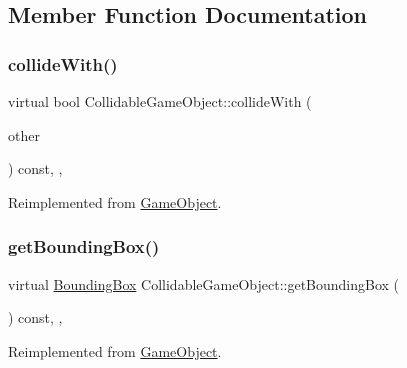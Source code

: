 \subsection{Member Function Documentation}
\mbox{\label{class_collidable_game_object_aabc837db5ee83847ad55a5f95cb106a6}} 
\subsubsection{\texorpdfstring{collide\+With()}{collideWith()}}
{\footnotesize\ttfamily virtual bool Collidable\+Game\+Object\+::collide\+With (\begin{DoxyParamCaption}\item[{const \hyperlink{class_game_object}{Game\+Object} $\ast$}]{other }\end{DoxyParamCaption}) const\hspace{0.3cm}{\ttfamily [inline]}, {\ttfamily [override]}, {\ttfamily [virtual]}}



Reimplemented from \hyperlink{class_game_object_a9ab7d2e2beff3e91ccdc87c9fbca019e}{Game\+Object}.

\mbox{\label{class_collidable_game_object_a7998e4aabd23263212e72f6a40d42036}} 
\subsubsection{\texorpdfstring{get\+Bounding\+Box()}{getBoundingBox()}}
{\footnotesize\ttfamily virtual \hyperlink{class_bounding_box}{Bounding\+Box} Collidable\+Game\+Object\+::get\+Bounding\+Box (\begin{DoxyParamCaption}{ }\end{DoxyParamCaption}) const\hspace{0.3cm}{\ttfamily [inline]}, {\ttfamily [override]}, {\ttfamily [virtual]}}



Reimplemented from \hyperlink{class_game_object_a64b37bea01266aea52a47f4a48a9cc84}{Game\+Object}.

